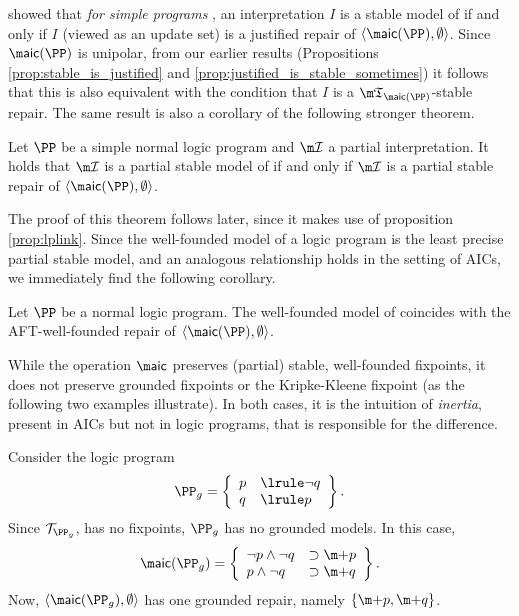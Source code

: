 \citet{tplp/CaropreseT11} showed that \emph{for simple programs \PP}, an interpretation $I$ is a stable model of \PP if and only if $I$ (viewed as an update set) is a justified repair of $\langle\aicop(\PP),\emptyset\rangle$. Since $\aicop(\PP)$ is unipolar, from our earlier results (Propositions \ref{prop:stable_is_justified} and \ref{prop:justified_is_stable_sometimes}) it follows that this is also equivalent with the condition that $I$ is a $\threeap_{\aicop(\PP)}$-stable repair. 
The same result is also a corollary of the following stronger theorem. 
\begin{theorem}\label{thm:partialstable-LP}
 Let $\PP$ be a simple normal logic program and $\pstruct$ a partial interpretation. It holds that $\pstruct$ is a partial stable model of \PP if and only if $\pstruct$ is a partial stable repair of $\langle \aicop(\PP),\emptyset\rangle$. 
\end{theorem}
The proof of this theorem follows later, since it makes use of proposition \ref{prop:lplink}. 
Since the well-founded model of a logic program is the least precise partial stable model, and an analogous relationship holds in the setting of AICs, we immediately find the following corollary. 

\begin{corollary}
 Let $\PP$ be a normal logic program. The well-founded model of \PP coincides with the AFT-well-founded repair of $\langle \aicop(\PP),\emptyset\rangle$. 
\end{corollary}

 While the operation $\aicop$ preserves (partial) stable, well-founded  fixpoints, it does not preserve grounded fixpoints or the Kripke-Kleene fixpoint (as the following two examples illustrate). In both cases, it is the intuition of \emph{inertia}, present in AICs but not in logic programs, that is responsible for the difference. 

 
\begin{example}\label{ex:grounded}
  Consider the logic program 
  \[\PP_g = \left\{\begin{array}{ll}p&\lrule \lnot q\\ q&\lrule p \end{array} \right\}.\]
  Since $\mathcal{T}_{\PP_g}$, has no fixpoints, $\PP_g$ has no grounded models. 
  In this case, 
  \[\aicop(\PP_g) = \left\{\begin{array}{ll}\lnot p\land \lnot q &\aicrule \add p \\ p \land  \lnot q &\aicrule \add q\end{array}\right\}.\]
  Now, $\langle \aicop(\PP_g),\emptyset\rangle$ has one grounded repair, namely $\{\add p, \add q\}$. 
\end{example}

